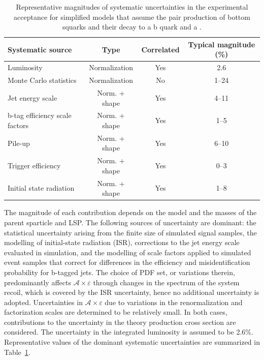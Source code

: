 \begin{table}[h!]
  \caption{
    Representative magnitudes of systematic uncertainties in the
    experimental acceptance for simplified models that assume the 
    pair production of bottom squarks and their decay to a b
    quark and a \chiz.}  
  \label{tab:signal_systs}
  \centering
  \footnotesize
  \begin{tabular}{ lccc }
    \hline
    Systematic source\T\B          & Type          & Correlated & Typical magnitude (\%) \\
    \hline
    Luminosity\T                   & Normalization & Yes        & 2.6                    \\
    Monte Carlo statistics         & Normalization & No         & 1--24                  \\
    Jet energy scale               & Norm. + shape & Yes        & 4--11                  \\
    b-tag efficiency scale factors & Norm. + shape & Yes        & 1--5                   \\
    Pile-up                        & Norm. + shape & Yes        & 6--10                  \\
    Trigger efficiency             & Norm. + shape & Yes        & 0--3                   \\
    Initial state radiation        & Norm. + shape & Yes        & 1--8                   \\
    \hline
  \end{tabular}
\end{table}

The magnitude of each contribution depends on the model and the masses
of the parent sparticle and LSP. The following sources of uncertainty
are dominant: the statistical uncertainty arising from the finite size
of simulated signal samples, the modelling of initial-state radiation
(ISR), corrections to the jet energy scale evaluated in simulation,
and the modelling of scale factors applied to simulated event samples
that correct for differences in the efficiency and misidentification
probability for b-tagged jets. The choice of PDF set, or variations
therein, predominantly affects $\mathcal{A}\times\varepsilon$ through
changes in the \pt spectrum of the system recoil, which is covered by
the ISR uncertainty, hence no additional uncertainty is
adopted. Uncertainties in $\mathcal{A}\times\varepsilon$ due to
variations in the renormalization and factorization scales are
determined to be relatively small. In both cases, contributions to the
uncertainty in the theory production cross section are considered. The
uncertainty in the integrated luminosity is assumed to be
2.6\%. Representative values of the dominant systematic uncertainties
are summarized in Table~\ref{tab:signal_systs}.

